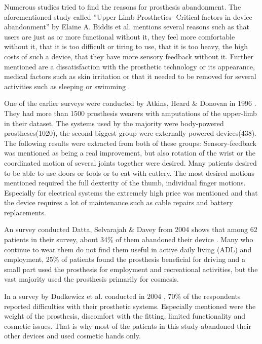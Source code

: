 \documentclass[main]{subfiles}
\begin{document}
Numerous studies tried to find the reasons for prosthesis abandonment. The aforementioned study called ''Upper Limb Prosthetics- Critical factors in device abandonment'' by Elaine A. Biddis et al. mentions several reasons such as that users are just as or more functional without it, they feel more comfortable without it, that it is too difficult or tiring to use, that it is too heavy, the high costs of such a device, that they have more sensory feedback without it. Further mentioned are a dissatisfaction with the prosthetic technology or its appearance, medical factors such as skin irritation or that it needed to be removed for several activities such as sleeping or swimming \cite{abandonment2}.

One of the earlier surveys were conducted by Atkins, Heard \& Donovan in 1996 \cite{Atkins1996}. They had more than 1500 prosthesis wearers with amputations of the upper-limb in their dataset. The systems used by the majority were body-powered prostheses(1020), the second biggest group were externally powered devices(438). The following results were extracted from both of these groups: Sensory-feedback was mentioned as being a real improvement, but also rotation of the wrist or the coordinated motion of several joints together were desired. Many patients desired to be able to use doors or tools or to eat with cutlery. The most desired motions mentioned required the full dexterity of the thumb, individual finger motions. Especially for electrical systems the extremely high price was mentioned and that the device requires a lot of maintenance such as cable repairs and battery replacements.

An survey conducted Datta, Selvarajah \& Davey from 2004 shows that among 62 patients in their survey, about 34\% of them abandoned their device \cite{Datta2004}. Many who continue to wear them do not find them useful in active daily living (ADL) and employment, 25\% of patients found the prosthesis beneficial for driving and a small part used the prosthesis for employment and recreational activities, but the vast majority used the prosthesis primarily for cosmesis. 

In a survey by Dudkewicz et al. conducted in 2004 \cite{Dudkiewicz2004}, 70\% of the respondents reported difficulties with their prosthetic systems. Especially mentioned were the weight of the prosthesis, discomfort with the fitting, limited functionality and cosmetic issues. That is why most of the patients in this study abandoned their other devices and used cosmetic hands only.
\end{document}
